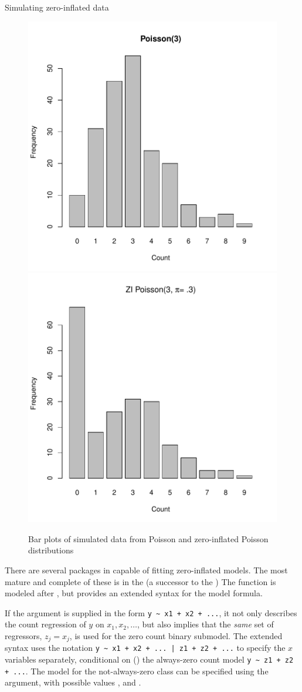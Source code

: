 \documentclass[11pt]{book}\usepackage[]{graphicx}\usepackage[]{color}
\newenvironment{knitrout}{}{} %
\renewenvironment{knitrout}{\small\renewcommand{\baselinestretch}{.85}}{} %
\begin{document}
\begin{Example}[zipois]{Simulating zero-inflated data}
\begin{knitrout}
\begin{figure}[!htbp]
\centerline{\includegraphics[width=.49\textwidth]{ch09/fig/zipois-plot-1} 
\includegraphics[width=.49\textwidth]{ch09/fig/zipois-plot-2} }

\caption[Bar plots of simulated data from Poisson and zero-inflated Poisson distributions]{Bar plots of simulated data from Poisson and zero-inflated Poisson distributions\label{fig:zipois-plot}}
\end{figure}


\end{knitrout}



\end{Example}

There are several packages in \R capable of fitting zero-inflated models.  The most mature and
complete of these is  in
the  (a successor to the )
The function  is modeled after , but provides an extended syntax
for the model formula.

If the  argument is supplied in the form
\verb|y ~ x1 + x2 + ...|, it not only describes the count regression of $y$ on
$x_1, x_2, \dots$, but also implies that the \emph{same} set of regressors, $z_j = x_j$,
is used for the zero count binary submodel.  The extended syntax  uses the
notation
\verb#y ~ x1 + x2 + ... | z1 + z2 + ...#
to specify the $x$ variables separately, conditional on (\code{|})
the always-zero count model \verb|y ~ z1 + z2 + ...|.
The model for the not-always-zero class can be specified using the
 argument, with possible values
,  and .
\end{document}
